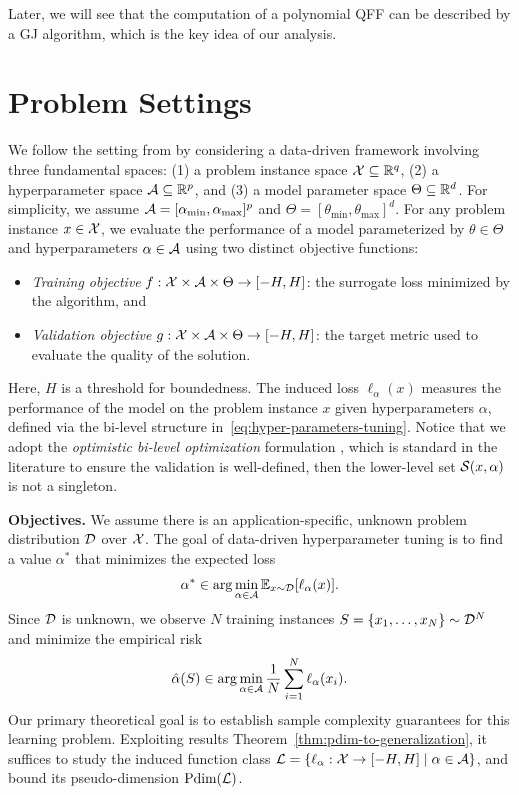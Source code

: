 \documentclass{article}
\theoremstyle{plain}
\theoremstyle{definition}
\theoremstyle{remark}
\newcommand*{\RR}{\mathbb{R}}
\begin{document}
Later, we will see that the computation of a polynomial QFF can be described by a GJ algorithm, which is the key idea of our analysis.

\section{Problem Settings}

We follow the setting from \citet{balcan2025sample} by considering a data-driven framework involving three fundamental spaces: (1) a problem instance space $\cX \subseteq \RR^q$, (2) a hyperparameter space $\mathcal{A} \subseteq \mathbb{R}^p$, and (3) a model parameter space $\Theta \subseteq \mathbb{R}^d$. For simplicity, we assume $\mathcal{A} = [\alpha_{\min}, \alpha_{\max}]^p$ and $\Theta = [\theta_{\min}, \theta_{\max}]^d$. For any problem instance $x \in \mathcal{X}$, we evaluate the performance of a model parameterized by $\theta \in \Theta$ and hyperparameters $\alpha \in \mathcal{A}$ using two distinct objective functions:
\begin{itemize}[leftmargin=*]
    \item \textit{Training objective} $f: \mathcal{X} \times \mathcal{A} \times \Theta \rightarrow [-H, H]$: the surrogate loss minimized by the algorithm, and
    \item \textit{Validation objective} $g: \mathcal{X} \times \mathcal{A} \times \Theta \rightarrow [-H, H]$: the target metric used to evaluate the quality of the solution.
\end{itemize}
Here, $H$ is a threshold for boundedness. The induced loss $\ell_\alpha(x)$ measures the performance of the model on the problem instance $x$ given hyperparameters $\alpha$, defined via the bi-level structure in~\eqref{eq:hyper-parameters-tuning}. Notice that we adopt the \textit{optimistic bi-level optimization} formulation \citep{dempe2002foundations}, which is standard in the literature to ensure the validation is well-defined, then the lower-level set $\mathcal{S}(x, \alpha)$ is not a singleton.

\textbf{Objectives.} We assume there is an application-specific, unknown problem distribution $\mathcal{D}$ over $\mathcal{X}$. The goal of data-driven hyperparameter tuning is to find a value $\alpha^*$ that minimizes the expected loss 
\[
\alpha^* \in \arg \min_{\alpha \in \mathcal{A}}\mathbb{E}_{x \sim \mathcal{D}} [\ell_\alpha(x)].
\]
Since $\mathcal{D}$ is unknown, we observe $N$ training instances $S = \{x_1, \dots, x_N\} \sim \mathcal{D}^N$ and minimize the empirical risk 
\[
\hat{\alpha}(S) \in \arg \min_{\alpha \in \mathcal{A}} \frac{1}{N} \sum_{i = 1}^N \ell_\alpha(x_i).
\]
Our primary theoretical goal is to establish sample complexity guarantees for this learning problem. Exploiting results Theorem~\ref{thm:pdim-to-generalization}, it suffices to study the induced function class $\mathcal{L} = \{\ell_\alpha: \mathcal{X} \rightarrow [-H, H] \mid \alpha \in \mathcal{A}\}$, and bound its pseudo-dimension $\text{\normalfont Pdim}(\mathcal{L})$. 
\end{document}
